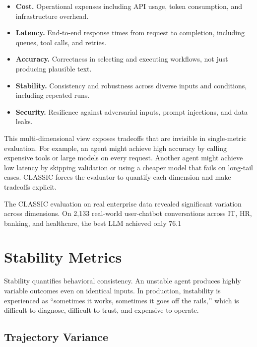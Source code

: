 \begin{itemize}
\item \textbf{Cost.} Operational expenses including API usage, token consumption, and infrastructure overhead.
\item \textbf{Latency.} End-to-end response times from request to completion, including queues, tool calls, and retries.
\item \textbf{Accuracy.} Correctness in selecting and executing workflows, not just producing plausible text.
\item \textbf{Stability.} Consistency and robustness across diverse inputs and conditions, including repeated runs.
\item \textbf{Security.} Resilience against adversarial inputs, prompt injections, and data leaks.
\end{itemize}

This multi-dimensional view exposes tradeoffs that are invisible in single-metric evaluation. For example, an agent might achieve high accuracy by calling expensive tools or large models on every request. Another agent might achieve low latency by skipping validation or using a cheaper model that fails on long-tail cases. CLASSIC forces the evaluator to quantify each dimension and make tradeoffs explicit.

The CLASSIC evaluation on real enterprise data \cite{classic2025} revealed significant variation across dimensions. On 2,133 real-world user-chatbot conversations across IT, HR, banking, and healthcare, the best LLM achieved only 76.1%

\section{Stability Metrics}

Stability quantifies behavioral consistency. An unstable agent produces highly variable outcomes even on identical inputs. In production, instability is experienced as ``sometimes it works, sometimes it goes off the rails,’’ which is difficult to diagnose, difficult to trust, and expensive to operate.

\subsection{Trajectory Variance}


